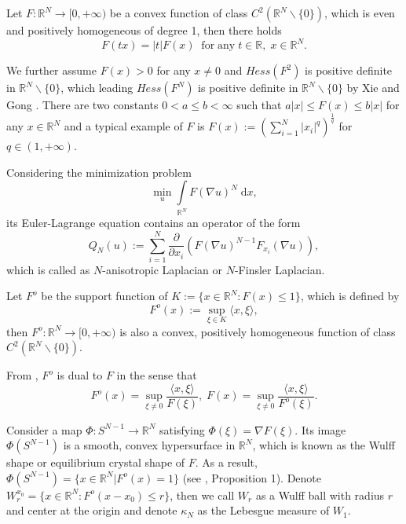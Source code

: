 \documentclass[11pt]{article}
\theoremstyle{plain}
\numberwithin{equation}{section}
\newcommand{\R}{\mathbb{R}}
\begin{document}
Let $F:\R^{N}\rightarrow[0,+\infty)$ be a convex function of class $C^{2}(\R^{N}\backslash\{0\})$, which is even and positively homogeneous of degree 1, then there holds
$$
F(tx)=\lvert t\rvert F(x)\;\;\mathrm{for}\;\mathrm{any}\;t\in\R,\;x\in\R^{N}.
$$


We further assume $F(x)>0$ for any $x\neq 0$ and $Hess(F^{2})$ is positive definite in $\R^{N}\backslash\{0\}$, which leading $Hess(F^{N})$ is positive definite in $\R^{N}\backslash\{0\}$ by Xie and Gong \cite{Xie-Gong-2016}. There are two constants $0<a\leq b<\infty$ such that $a\lvert x\rvert\leq F(x)\leq b\lvert x\rvert$ for any $x\in\R^{N}$ and a typical example of $F$ is $F(x):=(\sum\limits_{i=1}^{N}\lvert x_{i}\rvert^{q})^{\frac{1}{q}}$ for $q\in(1,+\infty)$.

Considering the minimization problem
$$
\min_{u}\int\limits_{\R^{N}}F(\nabla u)^{N}\;\mathrm{d}x,
$$
its Euler-Lagrange equation contains an operator of the form
$$
Q_{N}(u):=\sum_{i=1}^{N}\frac{\partial}{\partial x_{i}}(F(\nabla u)^{N-1}F_{x_{i}}(\nabla u)),
$$
which is called as $N$-anisotropic Laplacian or $N$-Finsler Laplacian.

Let $F^{o}$ be the support function of $K:=\{x\in\R^{N}:F(x)\leq 1\}$, which is defined by
$$
F^{o}(x):=\sup_{\xi\in K}\langle x,\xi\rangle,
$$
then $F^{o}:\R^{N}\rightarrow[0,+\infty)$ is also a convex, positively homogeneous function of class $C^{2}(\R^{N}\backslash\{0\})$.


From \cite{Alvino-Ferone-Trombetti-Lions-1997}, $F^{o}$ is dual to $F$ in the sense that
$$
F^{o}(x)=\sup_{\xi\neq 0}\frac{\langle x,\xi\rangle}{F(\xi)}, \;F(x)=\sup_{\xi\neq 0}\frac{\langle x,\xi\rangle}{F^{o}(\xi)}.
$$


Consider a map $\Phi:S^{N-1}\rightarrow\R^{N}$ satisfying $\Phi(\xi)=\nabla F(\xi)$. Its image $\Phi(S^{N-1})$ is a smooth, convex hypersurface in $\R^{N}$, which is known as the Wulff shape or equilibrium crystal shape of $F$. As a result, $\Phi(S^{N-1})=\{x\in\R^{N}|F^{o}(x)=1\}$ (see \cite{Wang-Xia-2011}, Proposition 1). Denote $W_{r}^{x_{0}}=\{x\in\R^{N}:F^{o}(x-x_{0})\leq r\}$, then we call $W_{r}$ as a Wulff ball with radius $r$ and center at the origin and denote $\kappa_{N}$ as the Lebesgue measure of $W_{1}$.
\end{document}
